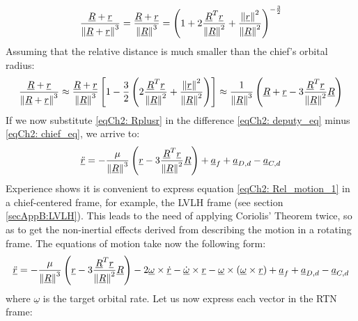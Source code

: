 	\[
	\dfrac{\underline{R} + \underline{r}}{\mbox{$\left\lVert \underline{R} + \underline{r} \right\rVert$}^{3}} = \dfrac{\underline{R} + \underline{r}}{\mbox{$\left\lVert \underline{R} \right\rVert$}^{3}} = \left( 1 + 2 \dfrac{\underline{R}^T \underline{r}}{\mbox{$\left\lVert \underline{R} \right\rVert$}^2} + \dfrac{\mbox{$\left\lVert \underline{r} \right\rVert$}^2}{\mbox{$\left\lVert \underline{R} \right\rVert$}^2} \right)^{-\frac{3}{2}}
	\]
	\indent Assuming that the relative distance is much smaller than the chief's orbital radius:
	\begin{equation}
	\dfrac{\underline{R} + \underline{r}}{\mbox{$\left\lVert \underline{R} + \underline{r} \right\rVert$}^{3}} \approx \dfrac{\underline{R} + \underline{r}}{\mbox{$\left\lVert \underline{R} \right\rVert$}^{3}} \left[1 - \frac{3}{2} \left( 2 \dfrac{\underline{R}^T \underline{r}}{\mbox{$\left\lVert \underline{R} \right\rVert$}^2} + \dfrac{\mbox{$\left\lVert \underline{r} \right\rVert$}^2}{\mbox{$\left\lVert \underline{R} \right\rVert$}^2} \right) \right] \approx  \dfrac{1}{\mbox{$\left\lVert \underline{R} \right\rVert$}^{3}} \left(\underline{R} + \underline{r} - 3 \dfrac{\underline{R}^T \underline{r}}{\mbox{$\left\lVert \underline{R} \right\rVert$}^2} \underline{R} \right)
	\label{eqCh2: 	Rplusr}
	\end{equation}
	\indent If we now substitute \eqref{eqCh2: 	Rplusr} in the difference \eqref{eqCh2:	deputy_eq} minus \eqref{eqCh2:	chief_eq}, we arrive to:
	\begin{equation}
	\underline{\ddot{r}} = - \dfrac{\mu}{\mbox{$\left\lVert \underline{R} \right\rVert$}^3} \left(\underline{r} - 3 \dfrac{\underline{R}^T \underline{r}}{\mbox{$\left\lVert \underline{R} \right\rVert$}^2} \underline{R} \right) + \underline{a}_f + \underline{a}_{D, d} - \underline{a}_{C, d}
	\label{eqCh2: 	Rel_motion_1}
	\end{equation}
	\indent Experience shows it is convenient to express equation \eqref{eqCh2: 	Rel_motion_1} in a chief-centered frame, for example, the LVLH frame (see section \ref{secAppB:LVLH}). This leads to the need of applying Coriolis' Theorem twice, so as to get the non-inertial effects derived from describing the motion in a rotating frame. The equations of motion take now the following form:
	\begin{equation}
	\underline{\ddot{r}} = - \dfrac{\mu}{\mbox{$\left\lVert \underline{R} \right\rVert$}^3} \left(\underline{r} - 3 \dfrac{\underline{R}^T \underline{r}}{\mbox{$\left\lVert \underline{R} \right\rVert$}^2} \underline{R} \right) - 2 \underline{\omega}\times  \underline{\dot{r}} - \underline{\dot{\omega}}\times \underline{r} - \underline{\omega}\times \left( \underline{\omega} \times \underline{r}\right) + \underline{a}_f + \underline{a}_{D, d} - \underline{a}_{C, d}
	\label{eqCh2: 	Rel_motion_2}
	\end{equation}
	\noindent where $\underline{\omega}$ is the target orbital rate. Let us now express each vector in the RTN frame:
